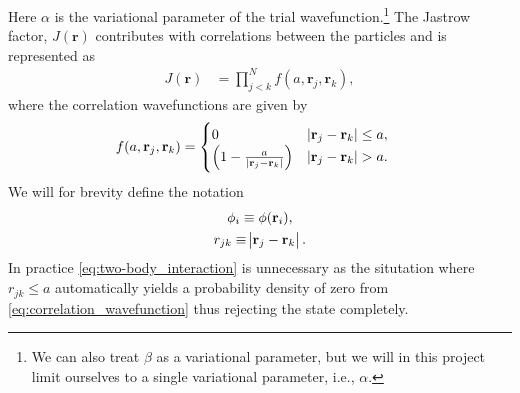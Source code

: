 \documentclass[
    a4paper, aps, twocolumn, floatfix, superscriptaddress,
    nofootinbib]{revtex4-1}
\newcommand{\vf}{\mathbf}
\newcommand{\1}{\mathds{1}}
\begin{document}
    Here $\alpha$ is the variational parameter of the trial
    wavefunction.\footnote{We can also treat $\beta$ as a variational parameter,
    but we will in this project limit ourselves to a single variational
    parameter, i.e., $\alpha$.} The Jastrow factor, $J(\vf{r})$ contributes with
    correlations between the particles and is represented as
    \begin{align}
        J(\vf{r})
        &=
        \prod_{j < k}^N f(a, \vf{r}_j, \vf{r}_k),
    \end{align}
    where the correlation wavefunctions are given by
    \begin{align}
        f(a, \vf{r}_j, \vf{r}_k)
        &=
        \begin{cases}
            0 & |\vf{r}_j - \vf{r}_k| \leq a, \\
            \Bigl(
                1 - \frac{a}{|\vf{r}_j - \vf{r}_k|}
            \Bigr) & |\vf{r}_j - \vf{r}_k| > a.
        \end{cases}
        \label{eq:correlation_wavefunction}
    \end{align}
    We will for brevity define the notation
    \begin{gather}
        \phi_i \equiv \phi(\vf{r}_i),
        \\
        r_{jk} \equiv \abs{\vf{r}_j - \vf{r}_k}.
    \end{gather}
    In practice \autoref{eq:two-body_interaction} is
    unnecessary as the situtation where $r_{jk} \leq a$ automatically yields a
    probability density of zero from \autoref{eq:correlation_wavefunction} thus
    rejecting the state completely.
\end{document}
